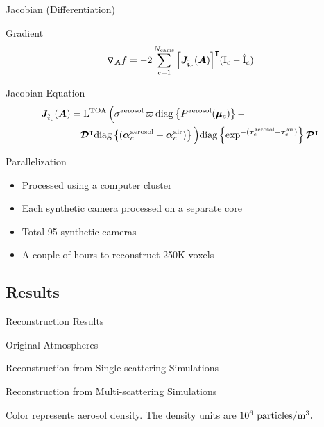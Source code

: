 \documentclass[compress,red,12pt]{beamer}
\newcommand{\OpDistance}{\bm{\mathcal{D}}}
\newcommand{\OpCamera}{\bm{\mathcal{P}}}
\newcommand{\OpDiag}[1]{\mathrm{diag}\left\{#1\right\}}
\newcommand{\Grad}[1]{\bm{\triangledown_{#1}}}
\newcommand{\vect}[1]{\bm{#1}}
\newcommand{\mat}[1]{\bm{#1}}
\newcommand{\transpose}[1]{{#1}^\intercal}
\begin{document}
\begin{frame}{Jacobian (Differentiation)}
  \begin{block}{Gradient}
    \begin{align*}
      \Grad{\mat{A}} f = -2\sum_{c=1}^{N_{\rm cams}}
      \transpose{\left[\mat{J}_{\hat{\vect{i}}_c}(\mat{A})\right]}(\mathrm{I}_c-\hat{\mathrm{I}}_c)
    \end{align*}
  \end{block}
  \pause
  \begin{block}{Jacobian Equation}
    \begin{align*}
      \mat{J}_{\hat{\vect{i}}_c}(\mat{A}) &= \mathrm{L}^{\rm TOA}\,
      \Big( \sigma^{\rm aerosol} \, \varpi \, \OpDiag{P^{\rm
          aerosol}(\vect{\mu}_c)} - \nonumber \\
      &\quad \transpose{\OpDistance} \OpDiag{ (\vect{\alpha}^{\rm
          aerosol}_c + \vect{\alpha}^{\rm air}_c )} \Big)
      \OpDiag{\exp^{-(\vect{\tau}^{\rm aerosol}_c + \vect{\tau}^{\rm
            air}_c)}}\transpose{\OpCamera}
    \end{align*}
  \end{block}
\end{frame}

\begin{frame}{Parallelization}
  \begin{itemize}
  \item Processed using a computer cluster
  \item Each synthetic camera processed on a separate core
  \item Total 95 synthetic cameras
  \item A couple of hours to reconstruct 250K voxels
  \end{itemize}
\end{frame}

\subsection{Results}

\begin{frame}{Reconstruction Results}
  \begin{overlayarea}{\textwidth}{5cm}
    {
      \centerline{Original Atmospheres}
      \centerline{\def\svgwidth{1.15\linewidth}\footnotesize{}}
    }
    {
      \centerline{Reconstruction from Single-scattering Simulations}
      \centerline{\def\svgwidth{1.15\linewidth}\footnotesize{}}
    }
    {
      \centerline{Reconstruction from Multi-scattering Simulations}
      \centerline{\def\svgwidth{1.15\linewidth}\footnotesize{}}
    }
  \end{overlayarea}
  \centerline{\footnotesize Color represents aerosol density. The
    density units are $10^{6}~{\rm particles}/{\rm m}^3.$}
\end{frame}
\end{document}

